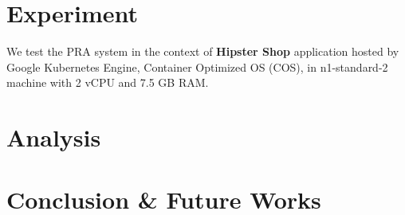 \documentclass[conference]{configs/IEEEtran}
\begin{document}
\section{Experiment}
We test the PRA system in the context of \textbf{Hipster Shop} application hosted by Google Kubernetes Engine, Container Optimized OS (COS), in n1-standard-2 machine with 2 vCPU and 7.5
GB RAM.

\section{Analysis}

\section{Conclusion \& Future Works}

%




\vspace{12pt}
\end{document}
